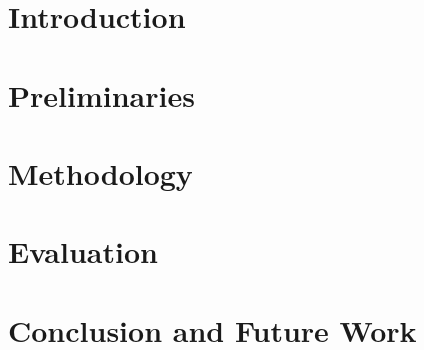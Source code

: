 \documentclass[headsepline,footsepline,footinclude=false,oneside,fontsize=11pt,paper=a4,listof=totoc,bibliography=totoc]{scrbook} %
\begin{document}


\frontmatter{}


% 

\tableofcontents{}

\mainmatter{}
\chapter{Introduction}





\chapter{Preliminaries}


\chapter{Methodology}



\chapter{Evaluation}




\chapter{Conclusion and Future Work}


% 
% 
% 
% 
% 

\appendix{}
\listoffigures{}
\listoftables{}
\printbibliography{}
\end{document}
